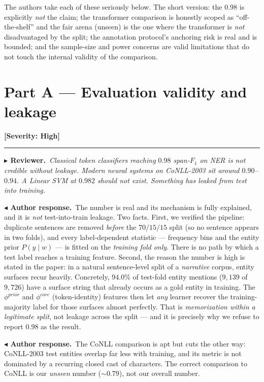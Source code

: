 \documentclass[11pt]{article}
\newcommand{\concern}[2]{%
  \par\medskip\noindent{\large\textbf{#1}}\hfill{\small #2}\par
  \vspace{2pt}\hrule\vspace{4pt}}
\newcommand{\Rev}[1]{\noindent\textcolor{revcol}{\textbf{$\blacktriangleright$ Reviewer.}}\ \textit{#1}\par\smallskip}
\newcommand{\Def}[1]{\noindent\textcolor{defcol}{\textbf{$\blacktriangleleft$ Author response.}}\ #1\par}
\newcommand{\sevH}{\textcolor{sevhigh}{\textbf{[Severity: High]}}}
\begin{document}
\medskip
\noindent The authors take each of these seriously below. The short version: the
$0.98$ is explicitly \emph{not} the claim; the transformer comparison is honestly
scoped as ``off-the-shelf'' and the fair arena (unseen) is the one where the
transformer is \emph{not} disadvantaged by the split; the annotation protocol's
anchoring risk is real and is bounded; and the sample-size and power concerns are
valid limitations that do not touch the internal validity of the comparison.

\section{Part A --- Evaluation validity and leakage}

\concern{A1. ``0.98 span-$F_1$ is impossibly high --- this is leakage.''}{\sevH}
\Rev{Classical token classifiers reaching $0.98$ span-$F_1$ on NER is not
credible without leakage. Modern neural systems on CoNLL-2003 sit around
$0.90$--$0.94$. A Linear SVM at $0.982$ should not exist. Something has leaked
from test into training.}
\Def{The number is real and its mechanism is fully explained, and it is
\emph{not} test-into-train leakage. Two facts. First, we verified the pipeline:
duplicate sentences are removed \emph{before} the $70/15/15$ split (so no sentence
appears in two folds), and every label-dependent statistic --- frequency bins and
the entity prior $P(y\mid w)$ --- is fitted on the \emph{training fold only}.
There is no path by which a test label reaches a training feature. Second, the
reason the number is high is stated in the paper: in a natural sentence-level
split of a \emph{narrative} corpus, entity surfaces recur heavily. Concretely,
$94.0\%$ of test-fold entity mentions ($9{,}139$ of $9{,}726$) have a surface
string that already occurs as a gold entity in training. The $\phi^{prior}$ and
$\phi^{core}$ (token-identity) features then let \emph{any} learner recover the
training-majority label for those surfaces almost perfectly. That is
\emph{memorization within a legitimate split}, not leakage across the split ---
and it is precisely why we refuse to report $0.98$ as the result.}
\Def{The CoNLL comparison is apt but cuts the other way: CoNLL-2003 test entities
overlap far less with training, and its metric is not dominated by a recurring
closed cast of characters. The correct comparison to CoNLL is our \emph{unseen}
number ($\sim\!0.79$), not our overall number.}
\end{document}
